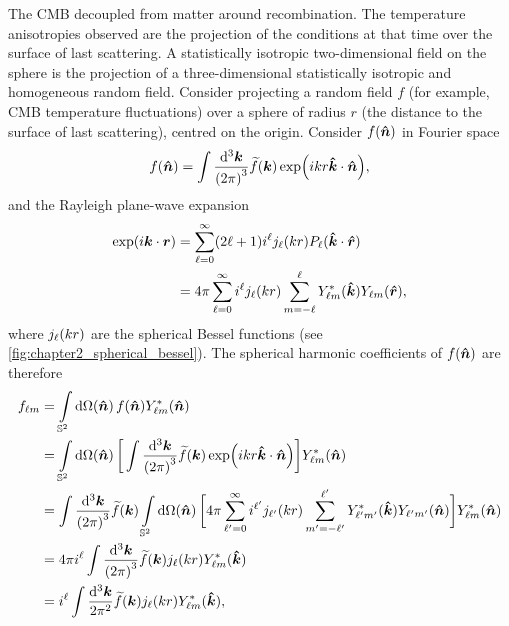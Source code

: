 The CMB decoupled from matter around recombination.
The temperature anisotropies observed are the projection of the conditions at that time over the surface of last scattering.
A statistically isotropic two-dimensional field on the sphere is the projection of a three-dimensional statistically isotropic and homogeneous random field.
Consider projecting a random field \(f\) (for example, CMB temperature fluctuations) over a sphere of radius \(r\) (the distance to the surface of last scattering), centred on the origin.
Consider \(f(\vu*{n})\) in Fourier space
%
\begin{equation}
	f(\vu*{n})
	= \int\frac{\dd[3]{\vb*{k}}}{{(2\pi)}^{3}} \fourier{f}(\vb*{k}) \exp(i k r\vu*{k}\cdot\vu*{n}),
\end{equation}
%
and the Rayleigh plane-wave expansion
%
\begin{align}
	\exp(i\vb*{k}\cdot\vb*{r})
	 & = \sum\limits_{\ell=0}^{\infty} (2\ell+1) i^{\ell} \bessel{k r} P_{\ell}(\vu*{k}\cdot\vu*{r}) \nonumber{}                                   \\
	 & = 4\pi \sum\limits_{\ell=0}^{\infty} i^{\ell} \bessel{k r} \sum\limits_{m=-\ell}^{\ell} \conj{\harmonic{Y}}(\vu*{k}) \harmonic{Y}(\vu*{r}),
\end{align}
%
where \(\bessel{k r}\) are the spherical Bessel functions (see \cref{fig:chapter2_spherical_bessel}).
The spherical harmonic coefficients of \(f(\vu*{n})\) are therefore
%
\begin{align}
	\harmonic{f}
	 & = \integrateSphere{\vu*{n}} f(\vu*{n}) \conj{\harmonic{Y}}(\vu*{n}) \nonumber{}                                                                                                                                                                                                                       \\
	 & = \integrateSphere{\vu*{n}} \bigg[\int\frac{\dd[3]{\vb*{k}}}{{(2\pi)}^{3}} \fourier{f}(\vb*{k}) \exp(i k r\vu*{k}\cdot\vu*{n})\bigg] \conj{\harmonic{Y}}(\vu*{n}) \nonumber{}                                                                                                                         \\
	 & = \int\frac{\dd[3]{\vb*{k}}}{{(2\pi)}^{3}} \fourier{f}(\vb*{k}) \integrateSphere{\vu*{n}} \bigg[4\pi \sum\limits_{\ell'=0}^{\infty} i^{\ell'} \bessel[']{k r} \sum\limits_{m'=-\ell'}^{\ell'} \conj{\harmonic[']{Y}}(\vu*{k}) \harmonic[']{Y}(\vu*{n})\bigg] \conj{\harmonic{Y}}(\vu*{n}) \nonumber{} \\
	 & = 4\pi i^{\ell} \int\frac{\dd[3]{\vb*{k}}}{{(2\pi)}^{3}} \fourier{f}(\vb*{k}) \bessel{k r} \conj{\harmonic{Y}}(\vu*{k}) \nonumber{}                                                                                                                                                                   \\
	 & = i^{\ell} \int\frac{\dd[3]{\vb*{k}}}{2\pi^{2}} \fourier{f}(\vb*{k}) \bessel{k r} \conj{\harmonic{Y}}(\vu*{k}),
\end{align}
